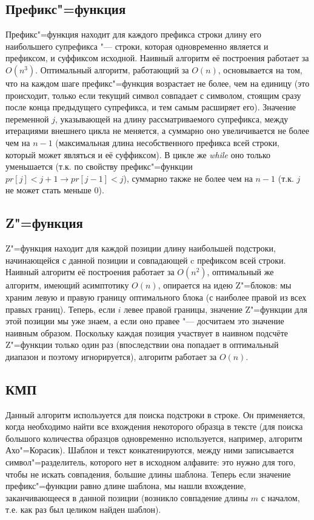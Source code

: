 \documentclass[otchet]{../SCWorks}
\begin{document}
\subsection{Префикс"=функция}
Префикс"=функция находит для каждого префикса строки длину его наибольшего супрефикса "--- строки, которая одновременно является и префиксом, и суффиксом исходной. Наивный алгоритм её построения работает за $O(n^3)$. Оптимальный алгоритм, работающий за $O(n)$, основывается на том, что на каждом шаге префикс"=функция возрастает не более, чем на единицу (это происходит, только если текущий символ совпадает с символом, стоящим сразу после конца предыдущего супрефикса, и тем самым расширяет его). Значение переменной $j$, указывающей на длину рассматриваемого супрефикса, между итерациями внешнего цикла не меняется, а суммарно оно увеличивается не более чем на $n - 1$ (максимальная длина несобственного префикса всей строки, который может являться и её суффиксом). В цикле же \textit{while} оно только уменьшается (т.к. по свойству префикс"=функции $pr[j] < j + 1 \rightarrow pr[j - 1] < j$), суммарно также не более чем на $n - 1$ (т.к. $j$ не может стать меньше 0).

\subsection{Z"=функция}
Z"=функция находит для каждой позиции длину наибольшей подстроки, начинающейся с данной позиции и совпадающей c префиксом всей строки. Наивный алгоритм её построения работает за $O(n^2)$, оптимальный же алгоритм, имеющий асимптотику $O(n)$, опирается на идею Z"=блоков: мы храним левую и правую границу оптимального блока (с наиболее правой из всех правых границ). Теперь, если $i$ левее правой границы, значение Z"=функции для этой позиции мы уже знаем, а если оно правее "--- досчитаем это значение наивным образом. Поскольку каждая позиция участвует в наивном подсчёте Z"=функции только один раз (впоследствии она попадает в оптимальный диапазон и поэтому игнорируется), алгоритм работает за $O(n)$. 

\subsection{КМП}
Данный алгоритм используется для поиска подстроки в строке. Он применяется, когда необходимо найти все вхождения некоторого образца в тексте (для поиска большого количества образцов одновременно используется, например, алгоритм Ахо"=Корасик). Шаблон и текст конкатенируются, между ними записывается символ"=разделитель, которого нет в исходном алфавите: это нужно для того, чтобы не искать совпадения, большие длины шаблона. Теперь если значение префикс"=функции равно длине шаблона, мы нашли вхождение, заканчивающееся в данной позиции (возникло совпадение длины $m$ с началом, т.е. как раз был целиком найден шаблон).
\end{document}
